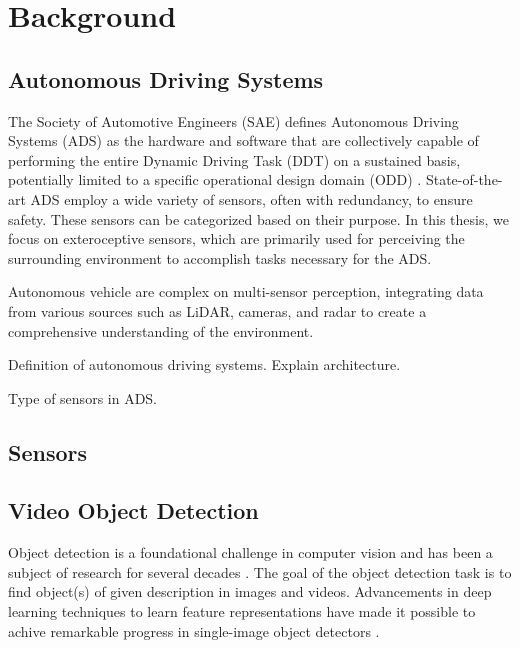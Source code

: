 \section{Background}  \label{Background}

\subsection{Autonomous Driving Systems} \label{Background:ADS}

The Society of Automotive Engineers (SAE) defines Autonomous Driving Systems (ADS) as the hardware and software that are collectively capable of performing the entire Dynamic Driving Task (DDT) on a sustained basis, potentially limited to a specific operational design domain (ODD) \cite{sae:j3016:2021apr}. State-of-the-art ADS employ a wide variety of sensors, often with redundancy, to ensure safety. These sensors can be categorized based on their purpose. In this thesis, we focus on exteroceptive sensors, which are primarily used for perceiving the surrounding environment to accomplish tasks necessary for the ADS.






Autonomous vehicle are complex on multi-sensor perception, integrating data from various sources such as LiDAR, cameras, and radar to create a comprehensive understanding of the environment.

Definition of autonomous driving systems. Explain architecture.

Type of sensors in ADS.

\subsection{Sensors} \label{Background:Sensors}



\subsection{Video Object Detection} \label{Background:VideoObjectDetection}


Object detection is a foundational challenge in computer vision and has been a subject of research for several decades \cite{fischlerRepresentationMatchingPictorial1973}. The goal of the object detection task is to find object(s) of given description in images and videos. Advancements in deep learning techniques to learn feature representations \cite{hintonReducingDimensionalityData2006, lecunDeepLearning2015} have made it possible to achive remarkable progress in single-image object detectors \cite{girshickRichFeatureHierarchies2014a}.

